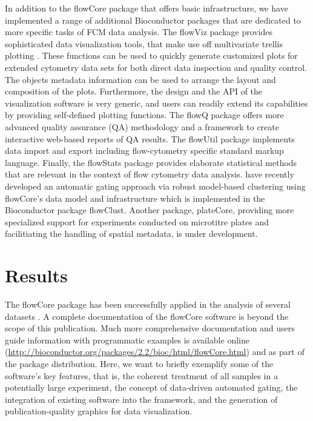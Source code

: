 \documentclass[12pt]{article}
\newcommand{\Rpackage}[1]{{\textsf{#1}}}
\begin{document}
In addition to the \Rpackage{flowCore} package that offers basic
infrastructure, we have implemented a range of additional Bioconductor
packages that are dedicated to more specific tasks of FCM data
analysis. The \Rpackage{flowViz} package \citep{sarkar2008ufv}
provides sophisticated data visualization tools, that make use off
multivariate trellis plotting \citep{lattice}.  These functions can be
used to quickly generate customized plots for extended cytometry data
sets for both direct data inspection and quality control.  The objects
metadata information can be used to arrange the layout and composition
of the plots.  Furthermore, the design and the API of the
visualization software is very generic, and users can readily extend
its capabilities by providing self-defined plotting functions.  The
\Rpackage{flowQ} package offers more advanced quality assurance (QA)
methodology and a framework to create interactive web-based reports of
QA results. The \Rpackage{flowUtil} package implements data import and
export including flow-cytometry specific standard markup
language. Finally, the \Rpackage{flowStats} package provides elaborate
statistical methods that are relevant in the context of flow
cytometry data analysis. \cite{lo2008agf} have recently developed an
automatic gating approach via robust model-based clustering using
\Rpackage{flowCore}'s data model and infrastructure which is
implemented in the Bioconductor package \Rpackage{flowClust}. Another
package, \Rpackage{plateCore}, providing more specialized support for
experiments conducted on microtitre plates and facilitiating the
handling of spatial metadata, is under development.

\section*{Results}
The \Rpackage{flowCore} package has been successfully applied in the
analysis of several datasets
\citep{gasparetto2004ice,brinkman2007hcf}. A complete documentation of
the \Rpackage{flowCore} software is beyond the scope of this
publication.  Much more comprehensive documentation and users guide
information with programmatic examples is available online
(\url{http://bioconductor.org/packages/2.2/bioc/html/flowCore.html})
and as part of the package distribution. Here, we want to briefly
exemplify some of the software's key features, that is, the coherent
treatment of all samples in a potentially large experiment, the
concept of data-driven automated gating, the integration of existing
software into the framework, and the generation of publication-quality
graphics for data visualization.
\end{document}
